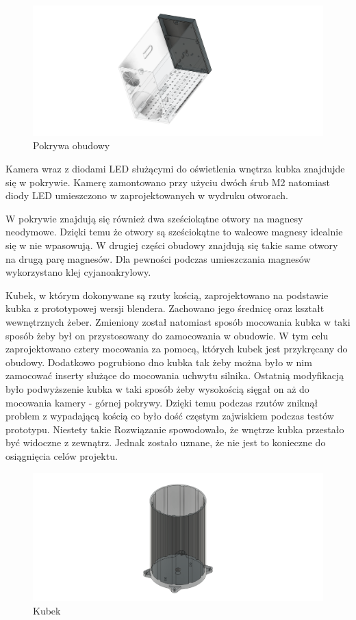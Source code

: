 \begin{figure}[H]
    \centering
    \includegraphics[width=0.95\linewidth]{chapters/03-praca-wlasna/figures/pokrywa.png}
    \caption{\label{fig:pokrywa}Pokrywa obudowy}
\end{figure}

Kamera wraz z diodami LED służącymi do oświetlenia wnętrza kubka znajdujde się w pokrywie. Kamerę zamontowano przy użyciu dwóch śrub M2 natomiast
diody LED umieszczono w zaprojektowanych w wydruku otworach.

W pokrywie znajdują się również dwa sześciokątne otwory na magnesy neodymowe. Dzięki temu że otwory są sześciokątne to walcowe magnesy idealnie
się w nie wpasowują. W drugiej części obudowy znajdują się takie same otwory na drugą parę magnesów. Dla pewności podczas umieszczania magnesów 
wykorzystano klej cyjanoakrylowy.

Kubek, w którym dokonywane są rzuty kością, zaprojektowano na podstawie kubka z prototypowej wersji blendera. Zachowano jego średnicę oraz kształt wewnętrznych
żeber. Zmieniony został natomiast sposób mocowania kubka w taki sposób żeby był on przystosowany do zamocowania w obudowie. W tym celu zaprojektowano
cztery mocowania za pomocą, których kubek jest przykręcany do obudowy. Dodatkowo pogrubiono dno kubka tak żeby można było w nim zamocować inserty służące 
do mocowania uchwytu silnika. Ostatnią modyfikacją było podwyższenie kubka w taki sposób żeby wysokością sięgał on aż do mocowania kamery - górnej pokrywy.
Dzięki temu podczas rzutów zniknął problem z wypadającą kością co było dość częstym zajwiskiem podczas testów prototypu. Niestety takie Rozwiązanie
spowodowało, że wnętrze kubka przestało być widoczne z zewnątrz. Jednak zostało uznane, że nie jest to konieczne do osiągnięcia celów projektu.

\begin{figure}[H]
    \centering
    \includegraphics[width=0.95\linewidth]{chapters/03-praca-wlasna/figures/kubek.png}
    \caption{\label{fig:kubek}Kubek}
\end{figure}

